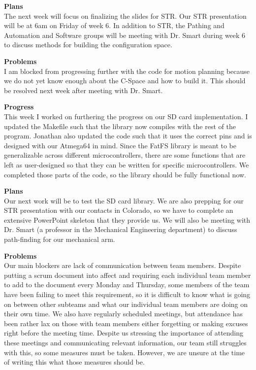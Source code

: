 \textbf{Plans} \\ 
The next week will focus on finalizing the slides for STR. Our STR presentation will be at 6am on Friday of week 6. In addition to STR, the Pathing and Automation and Software groups will be meeting with Dr. Smart during week 6 to discuss methods for building the configuration space.

\textbf{Problems} \\ 
I am blocked from progressing further with the code for motion planning because we do not yet know enough about the C-Space and how to build it. This should be resolved next week after meeting with Dr. Smart.

\textbf{Progress} \\
This week I worked on furthering the progress on our SD card implementation. I updated the Makefile such that the 
library now compiles with the rest of the program. Jonathan also updated the code such that it uses the correct pins
and is designed with our Atmega64 in mind. Since the FatFS library is meant to be generalizable across different
microcontrollers, there are some functions that are left as user-designed so that they can be written for specific
microcontrollers. We completed those parts of the code, so the library should be fully functional now.

\textbf{Plans} \\ 
Our next work will be to test the SD card library. We are also prepping for our STR presentation with our contacts
in Colorado, so we have to complete an extensive PowerPoint skeleton that they provide us. We will also be meeting with
Dr. Smart (a professor in the Mechanical Engineering department) to discuss path-finding for our mechanical arm.

\textbf{Problems} \\ 
Our main blockers are lack of communication between team members. Despite putting a scrum document into affect and 
requiring each individual team member to add to the document every Monday and Thursday, some members of the team
have been failing to meet this requirement, so it is difficult to know what is going on between other subteams
and what our individual team members are doing on their own time. We also have regularly scheduled meetings, but
attendance has been rather lax on those with team members either forgetting or making excuses right before the meeting
time. Despite us stressing the importance of attending these meetings and communicating relevant information, our team
still struggles with this, so some measures must be taken. However, we are unsure at the time of writing this what
those measures should be. 

